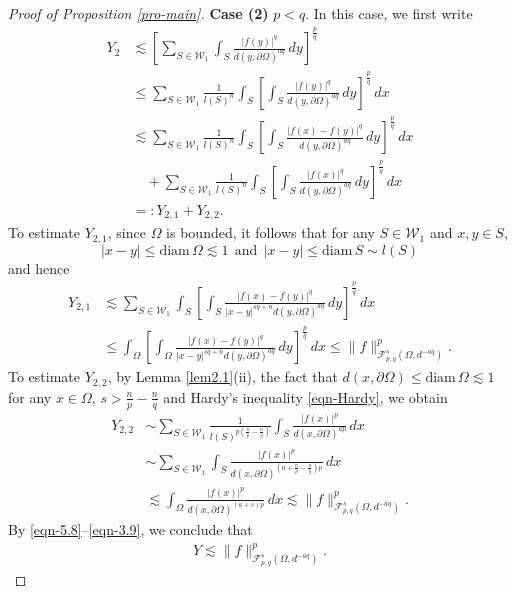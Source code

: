\documentclass[11pt,twoside]{article}
\def\cf{{\mathcal F}}
\def\boz{{\Omega}}
\def\pa{\partial}                %
\theoremstyle{mylem}
\theoremstyle{definition}
\numberwithin{equation}{section}
\begin{document}
\begin{proof}[Proof of Proposition \ref{pro-main}]
{\bf Case (2)} $p<q$. In this case, we first write
\begin{align*}
Y_2&\lesssim \left[ \sum_{S\in\mathcal{W}_1} \int_{S} \frac{ | f(y) |^q}{d(y,\pa\boz)^{aq}}\,dy \right]^{\frac{p}{q}} \\
&\leq \sum_{S\in\mathcal{W}_1} \frac{1}{l(S)^n} \int_{S }\left[\int_{S} \frac{ | f(y) |^q}{d(y,\pa\boz)^{aq}}\,dy \right]^{\frac{p}{q}}\,dx \\
&\lesssim \sum_{S\in\mathcal{W}_1} \frac{1}{l(S)^n} \int_{S }\left[\int_{S} \frac{ | f(x)-f(y) |^q}{d(y,\pa\boz)^{aq}}\,dy \right]^{\frac{p}{q}}\,dx \\
&\quad+\sum_{S\in\mathcal{W}_1} \frac{1}{l(S)^n} \int_{S }\left[\int_{S} \frac{ | f(x) |^q}{d(y,\pa\boz)^{aq}}\,dy \right]^{\frac{p}{q}}\,dx \\
&=:Y_{2,1}+Y_{2,2}.
\end{align*}
To estimate $Y_{2,1}$, since $\boz$ is bounded,
it follows that for any $S\in\mathcal{W}_1$ and $x,y\in S$,
$$
|x-y|\leq \mathrm{diam\,}\boz\lesssim1
\ \ \text{and}\ \ 
|x-y|\leq\mathrm{diam\,}S\sim l(S)$$
and hence
\begin{align}\label{eqn-3.8}
Y_{2,1}&\lesssim \sum_{S\in\mathcal{W}_1}\int_{S }\left[\int_{S} \frac{ | f(x)-f(y) |^q}{|x-y|^{sq+n}d(y,\pa\boz)^{aq}}\,dy \right]^{\frac{p}{q}}\,dx \nonumber \\
&\leq \int_{\boz}\left[\int_{\boz} \frac{ | f(x)-f(y) |^q}{|x-y|^{sq+n}d(y,\pa\boz)^{aq}}\,dy \right]^{\frac{p}{q}}\,dx 
\leq \| f \|_{\cf_{p,q}^{s}(\boz,d^{-aq})}^{p}.
\end{align}
To estimate $Y_{2,2}$,
by Lemma \ref{lem2.1}(ii),
the fact that $d(x,\partial\Omega)\leq\mathrm{diam\,}\Omega\lesssim1$
for any $x\in\Omega$,
$s>\frac{n}{p}-\frac{n}{q}$ and Hardy's inequality \eqref{eqn-Hardy}, we obtain
\begin{align}\label{eqn-3.9}
Y_{2,2}&\sim \sum_{S\in\mathcal{W}_1} \frac{1}{l(S)^{p(\frac{n}{p}-\frac{n}{q})}} \int_{S }\frac{ | f(x) |^p}{d(x,\pa\boz)^{ap}}\,dx \nonumber \\
&\sim \sum_{S\in\mathcal{W}_1}\int_{S}\frac{ | f(x) |^p}{d(x,\pa\boz)^{(a+\frac{n}{p}-\frac{n}{q})p}}\,dx \nonumber \\
&\lesssim\int_{\boz}\frac{ | f(x) |^p}{d(x,\pa\boz)^{(a+s)p}}\,dx
\lesssim \| f \|_{\cf_{p,q}^{s}(\boz,d^{-aq})}^{p}.
\end{align}
By \eqref{eqn-5.8}--\eqref{eqn-3.9}, we conclude that
\begin{align}\label{eqn-3.10}
Y\lesssim \| f \|_{\cf_{p,q}^{s}(\boz,d^{-aq})}^{p}.
\end{align}


\end{proof}
\end{document}
